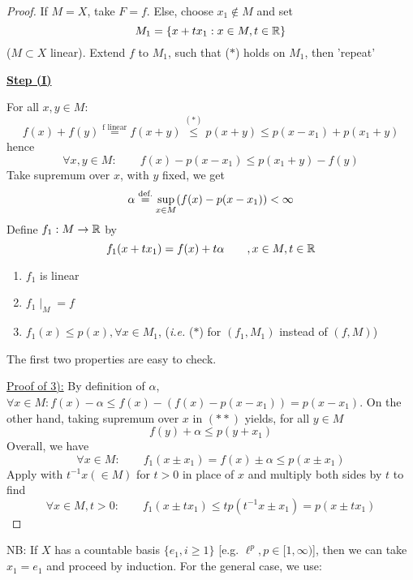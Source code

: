 \documentclass{article}
\begin{document}
\begin{proof}
    If $M=X$, take $F=f$. Else, choose $x_1 \notin M$ and set  
    $$
    M_1 = \{x+tx_1: x\in M, t\in \mathbb{R}\}
    $$
    ($M\subset X$ linear). Extend $f$ to $M_1$, such that ($*$) holds on $M_1$, then 'repeat'  

    \underline{\textbf{Step (I)}}\nl
    
    For all $x,y \in M$: 
    $$
    f(x)+f(y) \overset{\text{f \ linear}}{=} f(x+y) \overset{(*)}{\leq} p(x+y) \leq p(x-x_1)+p(x_1+y)
    $$
    hence 
    \begin{equation*}
        \forall x,y\in M: \qquad f(x)-p(x-x_1) \leq p(x_1+y) - f(y) \tag{$**$}
    \end{equation*}
    Take supremum over $x$, with $y$ fixed, we get  
    $$
    \alpha \stackrel{\text{def.}}{=} \sup_{x\in M} (f(x)-p(x-x_1)) < \infty
    $$
    Define $f_1: M\to \mathbb{R}$ by  
    $$
    f_1(x+tx_1) = f(x) + t\alpha \qquad ,x\in M, t\in \mathbb{R}
    $$
    \begin{lemma}
    \phantom{something}
        \begin{enumerate}[1)]
            \item $f_1$ is linear
            \item $f_1 \mid_M=f$ 
            \item $f_1(x) \leq p(x), \forall x \in M_1$, (\textit{i.e.} ($*$) for $(f_1, M_1)$ instead of $(f, M)$)
        \end{enumerate}
    \end{lemma}
    The first two properties are easy to check.  
    
    \underline{Proof of 3):}\nl
    By definition of $\alpha$, $\forall x \in M: f(x)-\alpha \leq f(x)-( f(x)-p(x-x_1)) = p(x-x_1)$. On the other hand, taking supremum over $x$ in $(**)$ yields, for all $y \in M$  
    $$
    f(y) + \alpha \leq p(y+x_1)
    $$  
    Overall, we have  
    $$
    \forall x\in M: \qquad f_1(x\pm x_1) = f(x) \pm \alpha \leq p(x \pm x_1)
    $$  
    Apply with $t^{-1}x(\in M)$ for $t > 0$ in place of $x$ and multiply both sides by $t$ to find  
    $$
    \forall x \in M, t>0: \qquad f_1(x \pm tx_1) \leq tp(t^{-1}x\pm x_1)=p(x\pm tx_1)
    $$
\end{proof}

NB: If $X$ has a countable basis $\{e_1, i\geq 1\}$ [e.g. $\ell^p, p\in [1,\infty)$], then we can take $x_1=e_1$ and proceed by induction. For the general case, we use:
\end{document}
